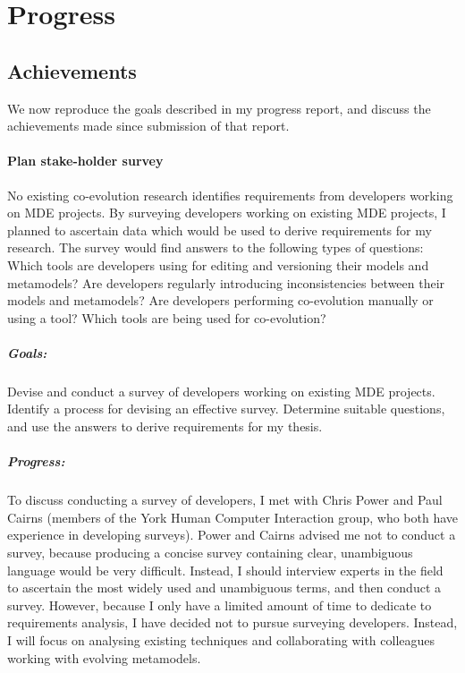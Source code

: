 

\section{Progress}

\subsection{Achievements}
We now reproduce the goals described in my progress report, and discuss the achievements made since submission of that report.

\paragraph{Plan stake-holder survey}
No existing co-evolution research identifies requirements from developers working on MDE projects. By surveying developers working on existing MDE projects, I planned to ascertain data which would be used to derive requirements for my research. The survey would find answers to the following types of questions: Which tools are developers using for editing and versioning their models and metamodels? Are developers regularly introducing inconsistencies between their models and metamodels? Are developers performing co-evolution manually or using a tool? Which tools are being used for co-evolution?

\subparagraph{Goals:} Devise and conduct a survey of developers working on existing MDE projects. Identify a process for devising an effective survey. Determine suitable questions, and use the answers to derive requirements for my thesis.

\subparagraph{Progress:} To discuss conducting a survey of developers, I met with Chris Power and Paul Cairns (members of the York Human Computer Interaction group, who both have experience in developing surveys). Power and Cairns advised me not to conduct a survey, because producing a concise survey containing clear, unambiguous language would be very difficult. Instead, I should interview experts in the field to ascertain the most widely used and unambiguous terms, and then conduct a survey. However, because I only have a limited amount of time to dedicate to requirements analysis, I have decided not to pursue surveying developers. Instead, I will focus on analysing existing techniques and collaborating with colleagues working with evolving metamodels.


